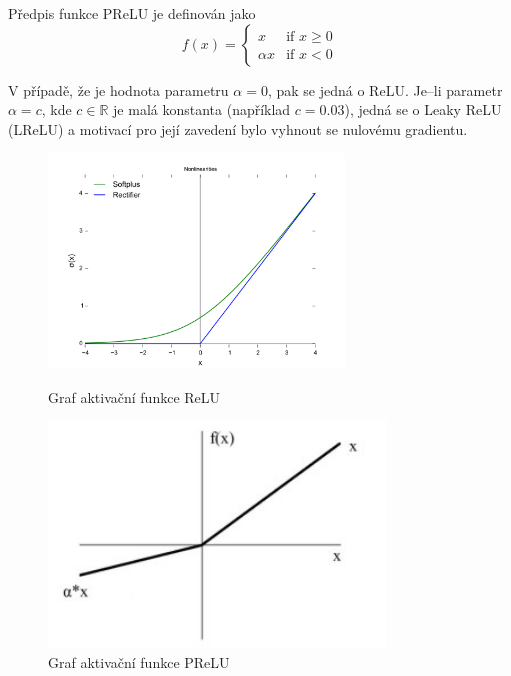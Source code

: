 Předpis funkce PReLU je definován jako
\begin{equation}
  f(x) =
  \begin{cases}
    x & \text{if } x \geq 0 \\
    {\alpha}x & \text{if } x < 0
  \end{cases}
\end{equation}


V případě, že je hodnota parametru $\alpha=0$, pak se jedná o ReLU. Je--li parametr $\alpha = c$, kde $c\in\mathbb{R}$ je malá konstanta (například $c = 0.03$), jedná se o Leaky ReLU (LReLU) a motivací pro její zavedení bylo vyhnout se nulovému gradientu.


\begin{figure}[H]
    \centering
    \begin{minipage}{0.45\textwidth}
        \centering
        \includegraphics[width=0.7\textwidth]{obrazky-figures/ReLU.png}
        \caption{\label{fig:relu}Graf aktivační funkce ReLU}
    \end{minipage}\hfill
    \begin{minipage}{0.45\textwidth}
        \centering
        \includegraphics[width=0.8\textwidth]{obrazky-figures/prelu.jpg}
        \caption{\label{fig:prelu}Graf aktivační funkce PReLU}
    \end{minipage}
\end{figure}


